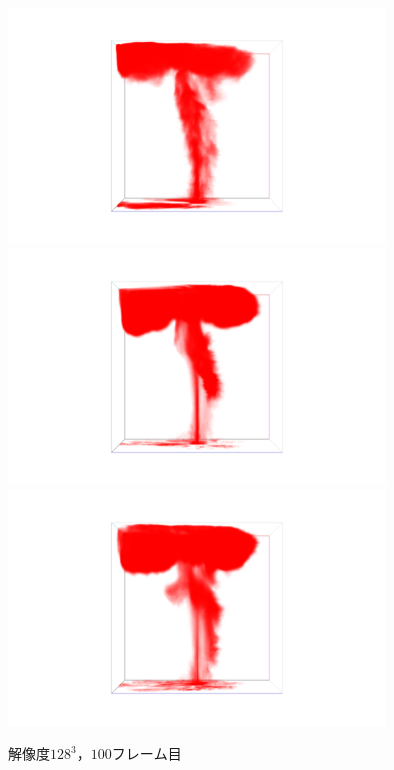 \documentclass[a4j,12pt]{jreport}
\begin{document}
\begin{figure}[htbp]
\caption{$解像度128^3，100フレーム目$}
\label{fig:n128_f100}
\centering
\includegraphics[width=100mm]{images/n128_f100_truth.png}
\includegraphics[width=100mm]{images/n128_f100_dev1.png}
\includegraphics[width=100mm]{images/n128_f100_dev2.png}
\end{figure}

\end{document}
